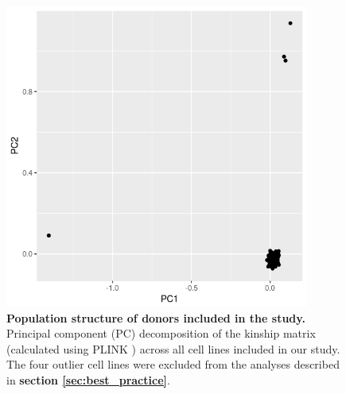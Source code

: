 \begin{figure}[h]
    \centering
    \includegraphics[width=10cm]{Appendix2/Fig/supplement_genotype_pcs.png}
    \caption[Population structure of donors included in the study]{\textbf{Population structure of donors included in the study.} \\
    Principal component (PC) decomposition of the kinship matrix (calculated using PLINK \cite{purcell2007plink}) across all cell lines included in our study.
    The four outlier cell lines were excluded from the analyses described in \textbf{section \ref{sec:best_practice}}.}
    \label{suppl_fig:kinship_pcs}
\end{figure}

